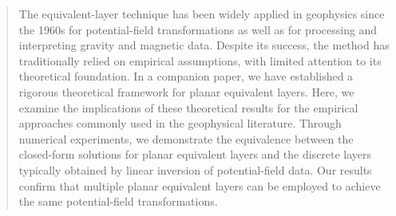 \begin{abstract}
	The equivalent-layer technique has been widely applied in geophysics since the 1960s 
	for potential-field transformations as well as for processing and interpreting 
	gravity and magnetic data. Despite its success, the method has traditionally relied 
	on empirical assumptions, with limited attention to its theoretical foundation. In a 
	companion paper, we have established a rigorous theoretical framework for planar equivalent layers. 
	Here, we examine the implications of these theoretical results for the empirical 
	approaches commonly used in the geophysical literature. Through 
	numerical experiments, we demonstrate the equivalence between the closed-form solutions for planar 
	equivalent layers and the discrete layers typically obtained by linear inversion of 
	potential-field data. Our results confirm that multiple planar equivalent 
	layers can be employed to achieve the same potential-field transformations.
\end{abstract}